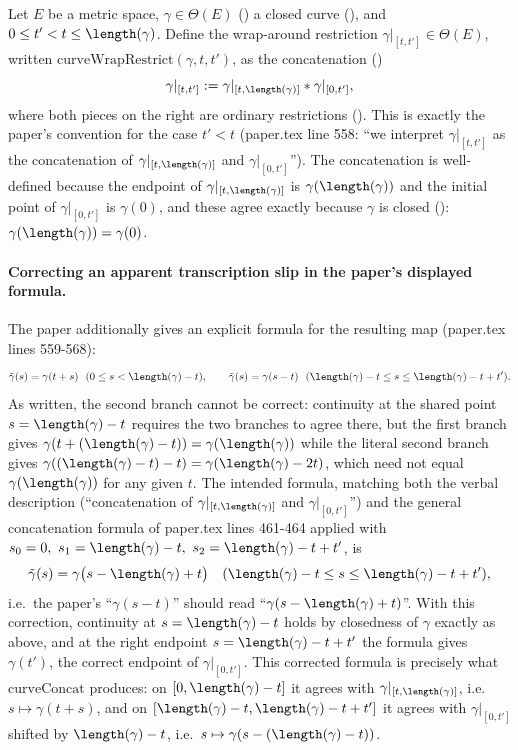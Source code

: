 \begin{definition}
  Let $E$ be a metric space, $\gamma \in \Theta(E)$ () a closed curve
  (), and $0 \le t' < t \le \length(\gamma)$. Define the wrap-around
  restriction $\gamma|_{[t,t']} \in \Theta(E)$, written $\mathrm{curveWrapRestrict}(\gamma,t,t')$,
  as the concatenation ()
  \[
    \gamma|_{[t,t']} := \gamma|_{[t,\length(\gamma)]} * \gamma|_{[0,t']}
    ,
  \]
  where both pieces on the right are ordinary restrictions (). This is
  exactly the paper's convention for the case $t' < t$ (paper.tex line 558: ``we interpret
  $\gamma|_{[t,t']}$ as the concatenation of $\gamma|_{[t,\length(\gamma)]}$ and
  $\gamma|_{[0,t']}$''). The concatenation is well-defined because the endpoint of
  $\gamma|_{[t,\length(\gamma)]}$ is $\gamma(\length(\gamma))$ and the initial point of
  $\gamma|_{[0,t']}$ is $\gamma(0)$, and these agree exactly because $\gamma$ is closed
  (): $\gamma(\length(\gamma)) = \gamma(0)$.

  \paragraph{Correcting an apparent transcription slip in the paper's displayed formula.} The
  paper additionally gives an explicit formula for the resulting map (paper.tex lines 559-568):
  \[
    \tilde\gamma(s) = \gamma(t+s) \ \ (0 \le s < \length(\gamma)-t)
    , \qquad
    \tilde\gamma(s) = \gamma(s-t) \ \ (\length(\gamma)-t \le s \le \length(\gamma)-t+t')
    .
  \]
  As written, the second branch cannot be correct: continuity at the shared point
  $s = \length(\gamma)-t$ requires the two branches to agree there, but the first branch gives
  $\gamma(t+(\length(\gamma)-t)) = \gamma(\length(\gamma))$ while the literal second branch gives
  $\gamma((\length(\gamma)-t)-t) = \gamma(\length(\gamma)-2t)$, which need not equal
  $\gamma(\length(\gamma))$ for any given $t$. The intended formula, matching both the verbal
  description (``concatenation of $\gamma|_{[t,\length(\gamma)]}$ and $\gamma|_{[0,t']}$'') and the
  general concatenation formula of paper.tex lines 461-464 applied with
  $s_0=0,\ s_1=\length(\gamma)-t,\ s_2 = \length(\gamma)-t+t'$, is
  \[
    \tilde\gamma(s) = \gamma\bigl(s-\length(\gamma)+t\bigr) \quad
    (\length(\gamma)-t \le s \le \length(\gamma)-t+t')
    ,
  \]
  i.e.\ the paper's ``$\gamma(s-t)$'' should read ``$\gamma(s-\length(\gamma)+t)$''. With this
  correction, continuity at $s=\length(\gamma)-t$ holds by closedness of $\gamma$ exactly as
  above, and at the right endpoint $s = \length(\gamma)-t+t'$ the formula gives $\gamma(t')$, the
  correct endpoint of $\gamma|_{[0,t']}$. This corrected formula is precisely what
  $\mathrm{curveConcat}$ produces: on $[0,\length(\gamma)-t]$ it agrees with
  $\gamma|_{[t,\length(\gamma)]}$, i.e.\ $s \mapsto \gamma(t+s)$, and on
  $[\length(\gamma)-t, \length(\gamma)-t+t']$ it agrees with $\gamma|_{[0,t']}$ shifted by
  $\length(\gamma)-t$, i.e.\ $s \mapsto \gamma(s-(\length(\gamma)-t))$.
\end{definition}
